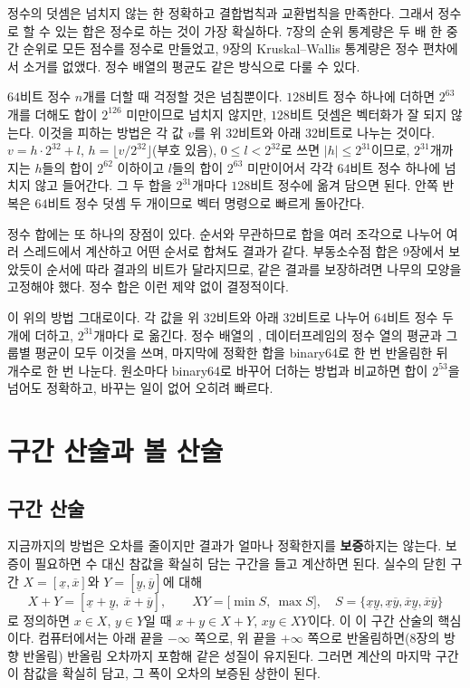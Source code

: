 정수의 덧셈은 넘치지 않는 한 정확하고 결합법칙과 교환법칙을 만족한다. 그래서 정수로 할 수 있는 합은 정수로 하는 것이 가장 확실하다. 7장의 순위 통계량은 두 배 한 중간 순위로 모든 점수를 정수로 만들었고, 9장의 Kruskal--Wallis 통계량은 정수 편차에서 소거를 없앴다. 정수 배열의 평균도 같은 방식으로 다룰 수 있다.

$64$비트 정수 $n$개를 더할 때 걱정할 것은 넘침뿐이다. $128$비트 정수 하나에 더하면 $2^{63}$개를 더해도 합이 $2^{126}$ 미만이므로 넘치지 않지만, $128$비트 덧셈은 벡터화가 잘 되지 않는다. 이것을 피하는 방법은 각 값 $v$를 위 $32$비트와 아래 $32$비트로 나누는 것이다. $v=h\cdot2^{32}+l$, $h=\lfloor v/2^{32}\rfloor$(부호 있음), $0\le l<2^{32}$로 쓰면 $|h|\le2^{31}$이므로, $2^{31}$개까지는 $h$들의 합이 $2^{62}$ 이하이고 $l$들의 합이 $2^{63}$ 미만이어서 각각 $64$비트 정수 하나에 넘치지 않고 들어간다. 그 두 합을 $2^{31}$개마다 $128$비트 정수에 옮겨 담으면 된다. 안쪽 반복은 $64$비트 정수 덧셈 두 개이므로 벡터 명령으로 빠르게 돌아간다.

정수 합에는 또 하나의 장점이 있다. 순서와 무관하므로 합을 여러 조각으로 나누어 여러 스레드에서 계산하고 어떤 순서로 합쳐도 결과가 같다. 부동소수점 합은 9장에서 보았듯이 순서에 따라 결과의 비트가 달라지므로, 같은 결과를 보장하려면 나무의 모양을 고정해야 했다. 정수 합은 이런 제약 없이 결정적이다.

\begin{instardust}
이 위의 방법 그대로이다. 각 값을 위 $32$비트와 아래 $32$비트로 나누어 $64$비트 정수 두 개에 더하고, $2^{31}$개마다 로 옮긴다. 정수 배열의 , 데이터프레임의 정수 열의 평균과 그룹별 평균이 모두 이것을 쓰며, 마지막에 정확한 합을 binary64로 한 번 반올림한 뒤 개수로 한 번 나눈다. 원소마다 binary64로 바꾸어 더하는 방법과 비교하면 합이 $2^{53}$을 넘어도 정확하고, 바꾸는 일이 없어 오히려 빠르다.
\end{instardust}

\section{구간 산술과 볼 산술}
\label{sec:interval}

\subsection{구간 산술}

지금까지의 방법은 오차를 줄이지만 결과가 얼마나 정확한지를 \textbf{보증}하지는 않는다. 보증이 필요하면 수 대신 참값을 확실히 담는 구간을 들고 계산하면 된다. 실수의 닫힌 구간 $X=[\underline x,\overline x]$와 $Y=[\underline y,\overline y]$에 대해
\[
X+Y=[\underline x+\underline y,\ \overline x+\overline y],\qquad XY=\bigl[\min S,\ \max S\bigr],\quad S=\{\underline x\underline y,\underline x\overline y,\overline x\underline y,\overline x\overline y\}
\]
로 정의하면 $x\in X$, $y\in Y$일 때 $x+y\in X+Y$, $xy\in XY$이다. 이 이 구간 산술의 핵심이다\cite{moore1966interval}. 컴퓨터에서는 아래 끝을 $-\infty$ 쪽으로, 위 끝을 $+\infty$ 쪽으로 반올림하면(8장의 방향 반올림) 반올림 오차까지 포함해 같은 성질이 유지된다. 그러면 계산의 마지막 구간이 참값을 확실히 담고, 그 폭이 오차의 보증된 상한이 된다.

